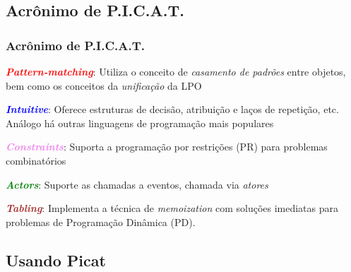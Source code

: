 \subsection{Acrônimo de \textbf{P.I.C.A.T.}}
\begin{frame}	 [fragile]

   \frametitle{Acrônimo de \textbf{P.I.C.A.T.}}
  
\hspace*{-10 mm}
\begin{flushleft}
	
\begin{description}[align=left]
	

 \item [\textbf{P}: ] {\bf \textcolor{red}{\textit{Pattern-matching}}}:  Utiliza o conceito de \textit{casamento de 
padrões} entre objetos, bem como os conceitos da \textit{unificação} da LPO

\item [\textbf{I}: ] {\bf \textcolor{blue}{\textit{Intuitive}}}: Oferece estruturas de decisão, atribuição e laços de
repetição, etc. Análogo há outras linguagens de programação mais populares

\item [\textbf{C}: ] {\bf \textcolor{violet}{\textit{Constraints}}}: Suporta a programação por restrições (PR) para 	
problemas combinatórios

 \item [\textbf{A}: ] {\bf \textcolor{green}{\textit{Actors}}}: Suporte as chamadas a eventos, chamada via \textit{atores}

\item [\textbf{T}: ] {\bf \textcolor{brown}{\textit{Tabling}}}: Implementa a técnica de \textit{memoization} com 
soluções imediatas para problemas de Programação Dinâmica (PD).
  \end{description}	

\end{flushleft}
  
\end{frame}



\subsection{Usando Picat}

